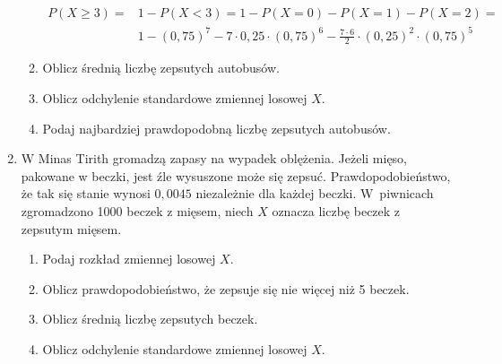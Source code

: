 \documentclass[twoside]{mwart}
\newcommand{\ans}[1]{}
\newcommand{\ans}[1]{\par\emph{Odpowiedź:} #1}
\begin{document}
\begin{enumerate}
\begin{enumerate}
{\begin{align*}
	 P(X\geq 3) = & 1-P(X<3)=1-P(X=0)-P(X=1)-P(X=2) = \\ & 1 - (0{,}75)^7 - 7\cdot 0{,}25 \cdot (0{,}75)^6 - \frac{7\cdot 6}{2} \cdot (0{,}25)^2\cdot (0{,}75)^5 
	\end{align*}
}
\item Oblicz średnią liczbę zepsutych autobusów.
\ans{
	\[ EX=np=7\cdot 0{,}25 = 1{,}75 \]
}
\item Oblicz odchylenie standardowe zmiennej losowej $X$.
\ans{
	\[ DX=\sqrt{np(1-p)}=\sqrt{7\cdot 0{,}25\cdot 0{,}75}=\frac{\sqrt{21}}{4} \approx 1{,}15 \]
}
\item Podaj najbardziej prawdopodobną liczbę zepsutych autobusów. \ans{
	Iloczyn $(n+1)p=2$ jest liczbą całkowitą, zatem mamy dwa punkty skokowe, które są najbardziej prawdopodobne:
	\[(n+1)p-1=1, (n+1)p=2\]}
\end{enumerate}
\item W Minas Tirith gromadzą zapasy na wypadek oblężenia. Jeżeli mięso,
pakowane w beczki, jest źle wysuszone może się zepsuć. Prawdopodobieństwo, że
tak się stanie wynosi $0{,}0045$ niezależnie dla każdej beczki. W~piwnicach zgromadzono 1000 beczek z mięsem,
niech $X$ oznacza liczbę beczek z zepsutym mięsem.  \begin{enumerate}
\item Podaj rozkład zmiennej losowej $X$. \ans{
	Mamy podobną sytuację jak w poprzednich zadaniach, możemy więc posłużyć się rozkładem dwumianowym:
	\[P(X=k)={1000\choose k}p^k(1-p)^{1000-k}\]
	Ponieważ mamy do czynienia z dużą liczbą mało prawdopodobnych prób ($n>50, p<0{,}1, np<10$) możemy posłużyć się też przybliżeniem rozkładem Poissona:
	\[ P(X=k) = \frac{\lambda^k}{k!}e^{-\lambda} \quad \lambda=1000\cdot0{,}0045=4{,}5\]}
\item Oblicz prawdopodobieństwo, że zepsuje się nie więcej niż 5 beczek. \ans{
	Możemy skorzystać ze stablicowanego rozkładu Poissona (dostępny na końcu tego rozdziału), odczytujemy wartości z wiersza odpowiadającego $\lambda=4{,}5$ i kolumn odpowiadających punktom skokowym, które nas interesują:
	\begin{align*}
		P(X\leq 5)= & P(X=0)+P(X=1)+P(X=2)+P(X=3)+P(X=4)+P(X=5) = \\ &
		0{,}0111	+ 0{,}0500	+ 0{,}1125	+ 0{,}1687	+ 0{,}1898	+ 0{,}1708 =
	0{,}70290
	\end{align*}
}
\item Oblicz średnią liczbę zepsutych beczek. \ans{$EX=\lambda=4{,}5$}
\item Oblicz odchylenie standardowe zmiennej losowej $X$. \ans{$DX=\sqrt{\lambda} = \sqrt{4{,}5}$}

\end{enumerate}
\end{enumerate}
\end{document}
